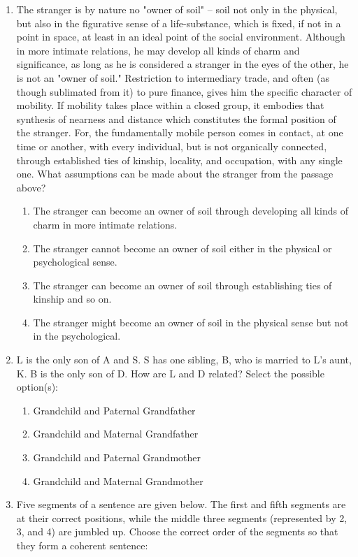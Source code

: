 \documentclass[12pt]{article}
\theoremstyle{remark}
\begin{document}
\begin{enumerate}
\hfill{}
\item The stranger is by nature no "owner of soil" -- soil not only in the physical, but also in the figurative sense of a life-substance, which is fixed, if not in a point in space, at least in an ideal point of the social environment. Although in more intimate relations, he may develop all kinds of charm and significance, as long as he is considered a stranger in the eyes of the other, he is not an "owner of soil." Restriction to intermediary trade, and often (as though sublimated from it) to pure finance, gives him the specific character of mobility. If mobility takes place within a closed group, it embodies that synthesis of nearness and distance which constitutes the formal position of the stranger. For, the fundamentally mobile person comes in contact, at one time or another, with every individual, but is not organically connected, through established ties of kinship, locality, and occupation, with any single one.
What assumptions can be made about the stranger from the passage above?
\begin{enumerate} 
\item The stranger can become an owner of soil through developing all kinds of charm in more intimate relations.
\item The stranger cannot become an owner of soil either in the physical or psychological sense.
\item The stranger can become an owner of soil through establishing ties of kinship and so on.
\item The stranger might become an owner of soil in the physical sense but not in the psychological.
\end{enumerate}
\hfill{}
\item L is the only son of A and S. S has one sibling, B, who is married to L’s aunt, K. B is the only son of D. How are L and D related? Select the possible option(s):
\begin{enumerate} 
\item Grandchild and Paternal Grandfather
\item Grandchild and Maternal Grandfather
\item Grandchild and Paternal Grandmother
\item Grandchild and Maternal Grandmother
\end{enumerate}
\hfill{}
\item Five segments of a sentence are given below. The first and fifth segments are at their correct positions, while the middle three segments (represented by 2, 3, and 4) are jumbled up. Choose the correct order of the segments so that they form a coherent sentence:

\end{enumerate}
\end{document}
